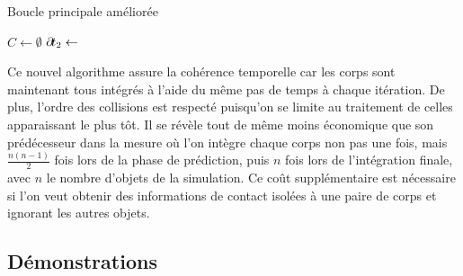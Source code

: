 \begin{algorithm}[h]
  \caption{Boucle principale améliorée}
  \label{algoMoteur2}
  \dontprintsemicolon
  \BlankLine
  $C \leftarrow \emptyset$\;
  \BlankLine
  \;
  $\partial \! t_2 \leftarrow$  
  \BlankLine
  \BlankLine
  \BlankLine
\end{algorithm}

Ce nouvel algorithme assure la cohérence temporelle car les corps sont
maintenant tous intégrés à l'aide du même pas de temps à chaque
itération. De plus, l'ordre des collisions est respecté puisqu'on se
limite au traitement de celles apparaissant le plus tôt. Il se révèle
tout de même moins économique que son prédécesseur dans la mesure o\`u
l'on intègre chaque corps non pas une fois, mais $\frac{n(n-1)}{2}$
fois lors de la phase de prédiction, puis $n$ fois lors de
l'intégration finale, avec $n$ le nombre d'objets de la simulation. Ce
coût supplémentaire est nécessaire si l'on veut obtenir des
informations de contact isolées à une paire de corps et ignorant les
autres objets.

\subsection{Démonstrations}

